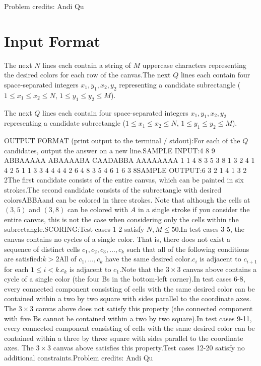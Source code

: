 \documentclass[12pt]{article}
\begin{document}
Problem credits: Andi Qu



\section*{Input Format}
The next $N$ lines each contain a string of $M$ uppercase characters
representing the desired colors for each row of the canvas.The next $Q$ lines each contain four space-separated integers $x_1,y_1,x_2,y_2$
representing a candidate subrectangle ($1\le x_1\le x_2\le N$,
$1\le y_1\le y_2\le M$).

The next $Q$ lines each contain four space-separated integers $x_1,y_1,x_2,y_2$
representing a candidate subrectangle ($1\le x_1\le x_2\le N$,
$1\le y_1\le y_2\le M$).

OUTPUT FORMAT (print output to the terminal / stdout):For each of the $Q$ candidates, output the answer on a new line.SAMPLE INPUT:4 8 9
ABBAAAAA
ABAAAABA
CAADABBA
AAAAAAAA
1 1 4 8
3 5 3 8
1 3 2 4
1 4 2 5
1 1 3 3
4 4 4 4
2 6 4 8
3 5 4 6
1 6 3 8SAMPLE OUTPUT:6
3
2
1
4
1
3
2
2The first candidate consists of the entire canvas, which can be painted in six
strokes.The second candidate consists of the subrectangle with desired colorsABBAand can be colored in three strokes. Note that although the cells at $(3,5)$ and
$(3,8)$ can be colored with $A$ in a single stroke if you consider the entire
canvas, this is not the case when considering only the cells within the
subrectangle.SCORING:Test cases 1-2 satisfy $N,M\le 50$.In test cases 3-5, the canvas contains no cycles of a single color. That is,
there does not exist a sequence of distinct cells $c_1,c_2,c_3,\ldots,c_k$  such
that all of the following conditions are satisfied:$k>2$All of $c_1,\ldots,c_k$ have the same desired color.$c_i$ is adjacent to $c_{i+1}$ for each $1\le i<k$.$c_k$ is adjacent to $c_1$.Note that the $3\times 3$ canvas above contains a cycle of a single color (the
four Bs in the bottom-left corner).In test cases 6-8, every connected component consisting of cells with the
same desired color can be contained within a two by two square with sides
parallel to the coordinate axes. The $3\times 3$ canvas above does not satisfy
this property (the connected component with five Bs cannot be contained within a
two by two square).In test cases 9-11, every connected component consisting of cells with the
same desired color can be contained within a three by three square with sides
parallel to the coordinate axes. The $3\times 3$ canvas above satisfies this
property.Test cases 12-20 satisfy no additional constraints.Problem credits: Andi Qu
\end{document}
